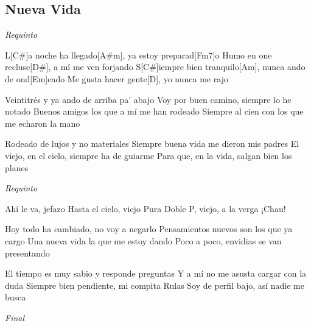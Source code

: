 \subsection{Nueva Vida}
\noindent

\vspace{1cm}

\begin{guitar}
	\begin{multicols}{2}
		\textit{Requinto}
		\par

		L[C#]a noche ha llegado[A#m], ya estoy preparad[Fm7]o
		Humo en one recluse[D#], a mí me ven forjando
		S[C#]iempre bien tranquilo[Am], nunca ando de ond[Em]eado
		Me gusta hacer gente[D], yo nunca me rajo

		Veintitrés y ya ando de arriba pa' abajo
		Voy por buen camino, siempre lo he notado
		Buenos amigos los que a mí me han rodeado
		Siempre al cien con los que me echaron la mano

		Rodeado de lujos y no materiales
		Siempre buena vida me dieron mis padres
		El viejo, en el cielo, siempre ha de guiarme
		Para que, en la vida, salgan bien los planes

		\par
		\textit{Requinto}
		\par

		Ahí le va, jefazo
		Hasta el cielo, viejo
		Pura Doble P, viejo, a la verga
		¡Chau!

		Hoy todo ha cambiado, no voy a negarlo
		Pensamientos nuevos son los que ya cargo
		Una nueva vida la que me estoy dando
		Poco a poco, envidias se van presentando

		El tiempo es muy sabio y responde preguntas
		Y a mí no me asusta cargar con la duda
		Siempre bien pendiente, mi compita Rulas
		Soy de perfil bajo, así nadie me busca
		\par
		\textit{Final}

	\end{multicols}
\end{guitar}

